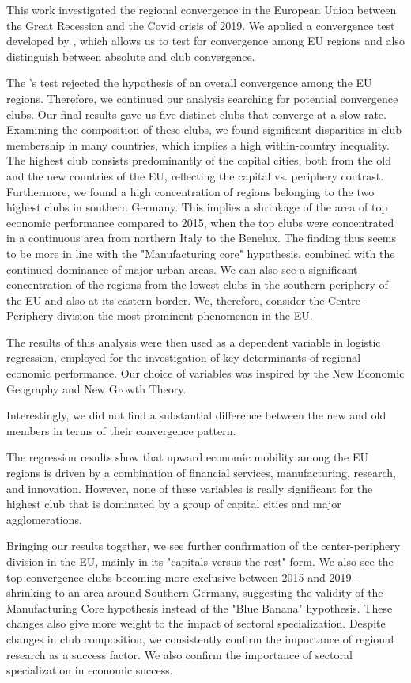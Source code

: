 \documentclass[11pt]{article}
\begin{document}
This work investigated the regional convergence in the European Union between the Great Recession and the Covid crisis of 2019. We applied a convergence test developed by \citet{phillips2009economic}, which allows us to test for convergence among EU regions and also distinguish between absolute and club convergence.

The \citeauthor{phillips2009economic}'s test rejected the hypothesis of an overall convergence among the EU regions. Therefore, we continued our analysis searching for potential convergence clubs. Our final results gave us five distinct clubs 
that converge at a slow rate. Examining the composition of these clubs, we found significant disparities in club membership in many countries, which implies a high within-country inequality. The highest club consists predominantly of the capital cities, both from the old and the new countries of the EU, reflecting the capital vs. periphery contrast. Furthermore, we found a high concentration of regions belonging to the two highest clubs in southern Germany. This implies a shrinkage of the area of top economic performance compared to 2015, when the top clubs were concentrated in a continuous area from northern Italy to the Benelux. The finding thus seems to be more in line with the "Manufacturing core" hypothesis, combined with the continued dominance of major urban areas. We can also see a significant concentration of the regions from the lowest clubs in the southern periphery of the EU and also at its eastern border. We, therefore, consider the Centre-Periphery division the most prominent phenomenon in the EU.

The results of this analysis were then used as a dependent variable in logistic regression, employed for the investigation of key determinants of regional economic performance. Our choice of variables was inspired by the New Economic Geography and New Growth Theory.


Interestingly, we did not find a substantial difference between the new and old members in terms of their convergence pattern.


The regression results show that upward economic mobility among the EU regions is driven by a combination of financial services, manufacturing, research, and innovation. However, none of these variables is really significant for the highest club that is dominated by a group of capital cities and major agglomerations.
 
 
Bringing our results together, we see further confirmation of the center-periphery division in the EU, mainly in its "capitals versus the rest" form. We also see the top convergence clubs becoming more exclusive between 2015 and 2019 - shrinking to an area around Southern Germany, suggesting the validity of the Manufacturing Core hypothesis instead of the "Blue Banana" hypothesis. These changes also give more weight to the impact of sectoral specialization. Despite changes in club composition, we consistently confirm the importance of regional research as a success factor. We also confirm the importance of sectoral specialization in economic success. 
\end{document}
